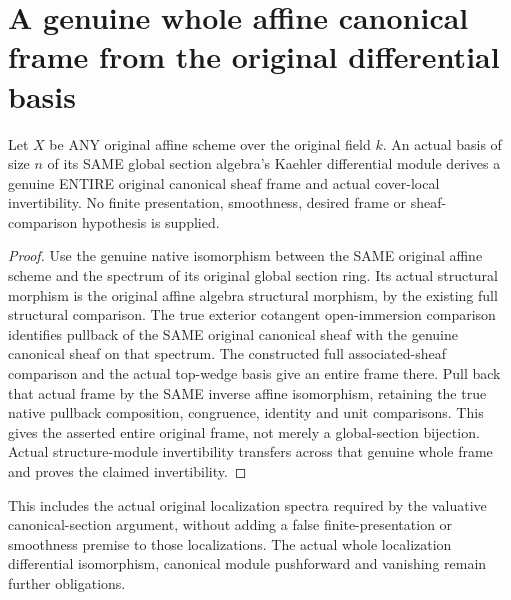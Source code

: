 \section{A genuine whole affine canonical frame from the original differential basis}
\label{sec:affine-canonical-basis-frame}

\begin{theorem}
\label{sc0-affine-canonical-basis:whole-frame}
\leanok
Let $X$ be ANY original affine scheme over the original field $k$.
An actual basis of size $n$ of its SAME global section algebra's
Kaehler differential module derives a genuine ENTIRE original
canonical sheaf frame and actual cover-local invertibility.
No finite presentation, smoothness, desired frame or
sheaf-comparison hypothesis is supplied.
\end{theorem}
\begin{proof}
Use the genuine native isomorphism between the SAME original affine
scheme and the spectrum of its original global section ring.
Its actual structural morphism is the original affine algebra
structural morphism, by the existing full structural comparison.
The true exterior cotangent open-immersion comparison identifies
pullback of the SAME original canonical sheaf with the genuine
canonical sheaf on that spectrum. The constructed full
associated-sheaf comparison and the actual top-wedge basis give
an entire frame there. Pull back that actual frame by the SAME
inverse affine isomorphism, retaining the true native pullback
composition, congruence, identity and unit comparisons. This gives
the asserted entire original frame, not merely a global-section
bijection. Actual structure-module invertibility transfers across
that genuine whole frame and proves the claimed invertibility.
\end{proof}

This includes the actual original localization spectra required by
the valuative canonical-section argument, without adding a false
finite-presentation or smoothness premise to those localizations.
The actual whole localization differential isomorphism, canonical
module pushforward and vanishing remain further obligations.

